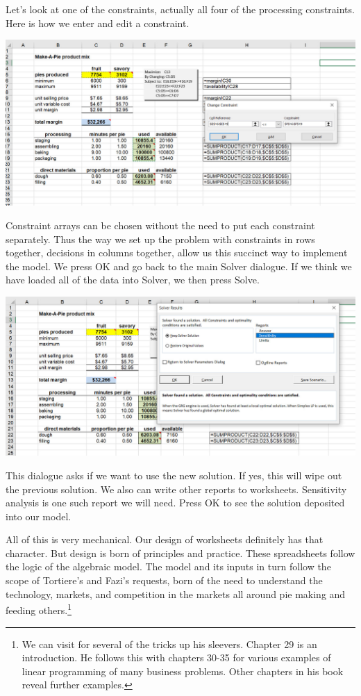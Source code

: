 \documentclass[
]{book}
\begin{document}
Let's look at one of the constraints, actually all four of the processing constraints. Here is how we enter and edit a constraint.

\includegraphics{images/03/pie-2-product-solver-2.jpg}

Constraint arrays can be chosen without the need to put each constraint separately. Thus the way we set up the problem with constraints in rows together, decisions in columns together, allow us this succinct way to implement the model. We press OK and go back to the main Solver dialogue. If we think we have loaded all of the data into Solver, we then press Solve.

\includegraphics{images/03/pie-2-product-solver-solve.jpg}

This dialogue asks if we want to use the new solution. If yes, this will wipe out the previous solution. We also can write other reports to worksheets. Sensitivity analysis is one such report we will need. Press OK to see the solution deposited into our model.

All of this is very mechanical. Our design of worksheets definitely has that character. But design is born of principles and practice. These spreadsheets follow the logic of the algebraic model. The model and its inputs in turn follow the scope of Tortiere's and Fazi's requests, born of the need to understand the technology, markets, and competition in the markets all around pie making and feeding others.\footnote{We can visit \citet{Winston2019} for several of the tricks up his sleevers. Chapter 29 is an introduction. He follows this with chapters 30-35 for various examples of linear programming of many business problems. Other chapters in his book reveal further examples.}
\end{document}

